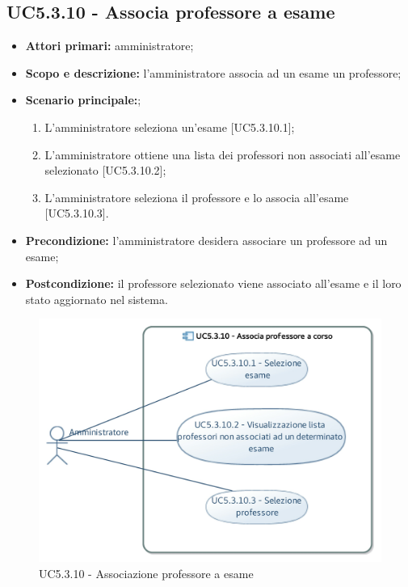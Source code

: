 \documentclass[AnalisiDeiRequisiti.tex]{subfiles}
\begin{document}
\subsection{UC5.3.10 - Associa professore a esame}
\begin{itemize}
	\item \textbf{Attori primari:} amministratore;
	\item \textbf{Scopo e descrizione:} l'amministratore associa ad un esame un professore;
	\item \textbf{Scenario principale:};
	\begin{enumerate}
		\item L'amministratore seleziona un'esame [UC5.3.10.1];
		\item L'amministratore ottiene una lista dei professori non associati all'esame selezionato [UC5.3.10.2];
		\item L'amministratore seleziona il professore e lo associa all'esame [UC5.3.10.3].
	\end{enumerate}
	\item \textbf{Precondizione:} l'amministratore desidera associare un professore ad un esame; 
	\item \textbf{Postcondizione:} il professore selezionato viene associato all'esame e il loro stato aggiornato nel sistema.
\end{itemize}
\begin{figure}[H]
	\centering
	\includegraphics[width=1.0\linewidth]{UC5_3_10.jpg}
	\caption{UC5.3.10 - Associazione professore a esame}
	\label{fig:UC5.3.10 - Associazione professore a esame}
\end{figure}
\end{document}
